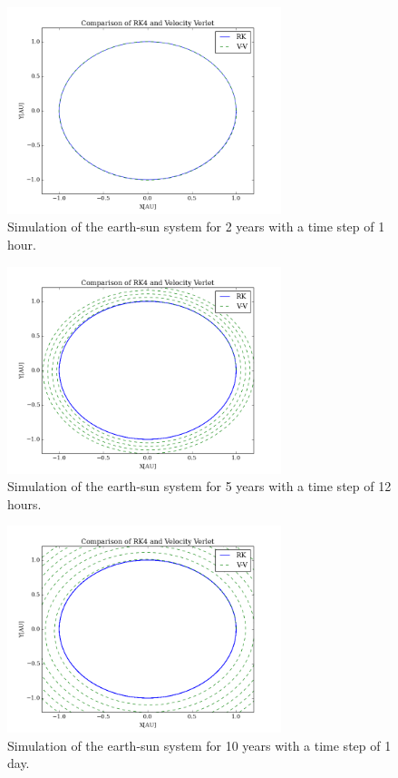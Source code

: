 \documentclass{aa}   %
\begin{document}
\begin{figure}[hbtp]
 \centering
 \includegraphics[width=80mm]{ES_1h_2y.png}
 \caption[]{\label{ES_1h_2y}
   Simulation of the earth-sun system for 2 years with a time step of 1 hour. 
 }
\end{figure}
\begin{figure}[hbtp]
 \centering
 \includegraphics[width=80mm]{ES_0_5d_5y.png}
 \caption[]{\label{ES_0_5d_5y}
   Simulation of the earth-sun system for 5 years with a time step of 12 hours. 
 }
\end{figure}
\begin{figure}[hbtp]
 \centering
 \includegraphics[width=80mm]{ES_1d_10y.png}
 \caption[]{\label{ES_1d_10y}
   Simulation of the earth-sun system for 10 years with a time step of 1 day. 
 }
\end{figure}
\end{document}
